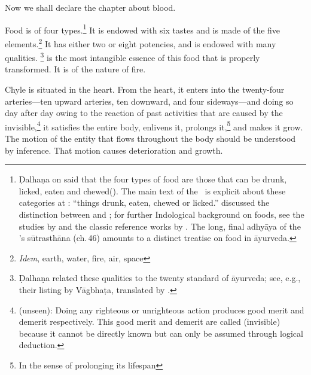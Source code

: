 \begin{translation}    
\item [1] Now we shall declare the chapter about blood.

\item [2]

    
\item [3] Food is of four types.\footnote{\label{fourfoods}Ḍalhaṇa on  said
    that the four types of food are those that can be drunk, licked, eaten
    and chewed(). The main text of the \CS\ is
    explicit about these categories at :
     “things drunk, eaten, chewed or licked.”
    \citet{yagi-1994} discussed the distinction between  and
    ; for further Indological background on foods, see the
    studies by \citet{oliv-1995,oliv-2001} and the classic reference works by
    \citet{acha-1994,acha-1998}. The long, final adhyāya of the
    \SS's sūtrasthāna (ch.\,46) amounts to a distinct treatise on food in 
    āyurveda.} It is endowed 
    with six tastes and is made
    of the five elements.\footnote{\emph{Idem}, earth, water, fire, air,
        space} It has either two or eight potencies, and is endowed with many
        qualities. \footnote{Ḍalhaṇa related these qualities to the twenty
            standard  of āyurveda; see, e.g., their listing by Vāgbhaṭa,
            translated by \citet[207]{wuja-2003}. }
             is the most intangible essence of this food that is
            properly transformed. It is of the nature of fire.
                
Chyle is situated in the heart. From the heart, it enters into the
twenty-four arteries—ten upward arteries, ten downward, and four
sideways—and doing so day after day owing to the reaction of past
activities that are caused by the invisible,\footnote{
    (unseen): Doing any righteous or unrighteous action produces good merit
    and demerit respectively. This good merit and demerit are called
     (invisible) because it cannot be directly known but can only
    be assumed through logical deduction.} it satisfies the entire body,
    enlivens it, prolongs it,\footnote{In the sense of prolonging its
        lifespan} and makes it grow. The motion of the entity that flows
        throughout the body should be understood by inference. That motion causes
        deterioration and growth.
    

\end{translation}
